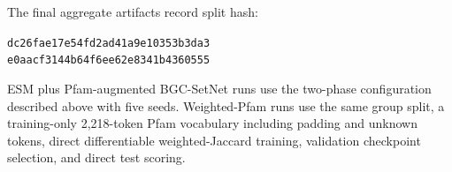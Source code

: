 \documentclass{article}
\begin{document}
The final aggregate artifacts record split hash:
\begin{center}
\small\texttt{dc26fae17e54fd2ad41a9e10353b3da3}\\
\texttt{e0aacf3144b64f6ee62e8341b4360555}
\end{center}
ESM plus Pfam-augmented BGC-SetNet runs use the two-phase configuration described above with five seeds. Weighted-Pfam runs use the same group split, a training-only 2,218-token Pfam vocabulary including padding and unknown tokens, direct differentiable weighted-Jaccard training, validation checkpoint selection, and direct test scoring.
\end{document}
